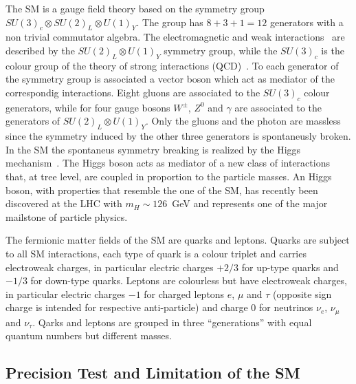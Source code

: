The SM is a gauge field theory based on the symmetry group $SU(3)_c \otimes SU(2)_L \otimes U(1)_Y$. The group has $8+3+1=12$
generators with a non trivial commutator algebra. The electromagnetic and weak interactions~\cite{EW1,EW2,EW3}  are described  by the 
$SU(2)_L \otimes U(1)_Y$ symmetry group, while the $ SU(3)_c$ is the colour group of the theory of strong interactions (QCD)~\cite{qcd1}.
To each generator of the symmetry group is associated a vector boson which act as mediator of the correspondig interactions.
Eight gluons are associated to the $ SU(3)_c$ colour generators, while for four gauge bosons $W^{\pm}$,
$Z^0$ and $\gamma$ are associated to the generators of $SU(2)_L \otimes U(1)_Y$. 
Only the gluons and the photon are massless since the symmetry induced by the other three generators is
spontaneusly broken. In the SM the spontaneus symmetry breaking is realized by the Higgs mechanism~\cite{ENGLERT,HIGGS,HIGGS2,HIGGS3,kibble}.
The Higgs boson acts as mediator of a new class of interactions that, at tree level, are coupled in proportion to the particle masses.
An Higgs boson, with properties that resemble the one of the SM, 
has recently been discovered at the LHC with $m_H \sim 126$~GeV \cite{AHiggsO,CHiggsO} and represents one of the major mailstone of particle physics.

The fermionic matter fields of the SM are quarks and leptons. 
Quarks  are subject to all SM interactions, each type of quark is a colour triplet and carries 
electroweak charges, in particular electric charges $+2/3$ for up-type quarks and $-1/3$
for down-type quarks.  Leptons are colourless
but have electroweak charges, in particular electric charges $-1$ for charged leptons $e$, $\mu$ and $\tau$ (opposite sign charge 
is intended for respective anti-particle)  and charge 0 for neutrinos $\nu_e$, $\nu_{\mu}$ and $\nu_{\tau}$.
Qarks and leptons are grouped in three  ``generations'' with equal quantum numbers but different masses.


\subsection{Precision Test and Limitation of the SM}

